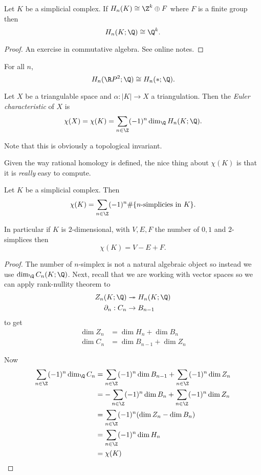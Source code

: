 \documentclass[a4paper]{article}
\renewcommand{\b}{\partial} %
\begin{document}
\begin{lemma}
  Let \(K\) be a simplicial complex. If \(H_n(K) \cong \Z^k \oplus F\) where \(F\) is a finite group then
  \[
    H_n(K; \Q) \cong \Q^k.
  \]
\end{lemma}

\begin{proof}
  An exercise in commutative algebra. See online notes.
\end{proof}

\begin{eg}
  For all \(n\),
  \[
    H_n(\R P^2; \Q) \cong H_n(*; \Q).
  \]
\end{eg}

\begin{definition}
  Let \(X\) be a triangulable space and \(\alpha: |K| \to X\) a triangulation. Then the \emph{Euler characteristic} of \(X\) is
  \[
    \chi(X) = \chi(K) = \sum_{n \in \Z} (-1)^n \dim_\Q H_n(K; \Q).
  \]
\end{definition}

Note that this is obviously a topological invariant.

Given the way rational homology is defined, the nice thing about \(\chi(K)\) is that it is \emph{really} easy to compute.

\begin{lemma}
  Let \(K\) be a simplicial complex. Then
  \[
    \chi(K) = \sum_{n \in \Z} (-1)^n \#\{n\text{-simplicies in } K\}.
  \]

  In particular if \(K\) is \(2\)-dimensional, with \(V, E, F\) the number of \(0, 1\) and \(2\)-simplices then
  \[
    \chi(K) = V - E + F.
  \]
\end{lemma}

\begin{proof}
  The number of \(n\)-simplex is not a natural algebraic object so instead we use \(\dim_\Q C_n(K; \Q)\). Next, recall that we are working with vector spaces so we can apply rank-nullity theorem to
  \begin{align*}
    Z_n(K; \Q) &\twoheadrightarrow H_n(K; \Q) \\
    \b_n: C_n &\to B_{n - 1}
  \end{align*}
  to get
  \begin{align*}
    \dim Z_n &= \dim H_n + \dim B_n \\
    \dim C_n &= \dim B_{n - 1} + \dim Z_n
  \end{align*}

  Now
  \begin{align*}
    \sum_{n \in \Z} (-1)^n \dim_\Q C_n
    &= \sum_{n \in \Z} (-1)^n \dim B_{n - 1} + \sum_{n \in \Z} (-1)^n \dim Z_n \\
    &= - \sum_{n \in \Z} (-1)^n \dim B_n + \sum_{n \in \Z} (-1)^n \dim Z_n \\
    &= \sum_{n \in \Z} (-1)^n (\dim Z_n - \dim B_n) \\
    &= \sum_{n \in \Z} (-1)^n \dim H_n \\
    &= \chi(K)
  \end{align*}
\end{proof}
\end{document}
